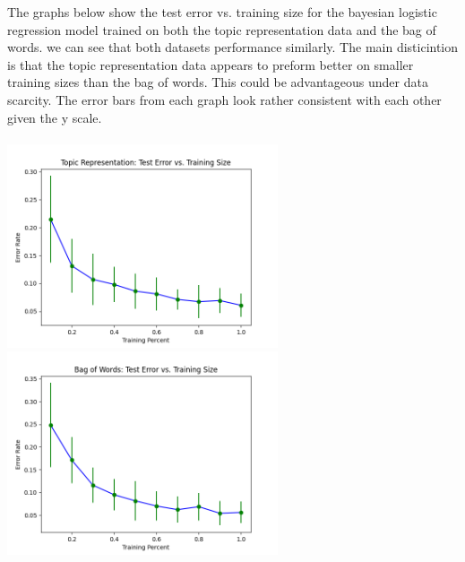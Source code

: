 \documentclass{article}
\begin{document}
The graphs below show the test error vs. training size for the bayesian logistic regression model trained on both the topic representation data and the bag of words. we can see that both datasets performance similarly. The main disticintion is that the topic representation data appears to preform better on smaller training sizes than the bag of words. This could be advantageous under data scarcity. The error bars from each graph look rather consistent with each other given the y scale.
\\ \\
\includegraphics[width=0.6\textwidth]{../output/t2-topic.png}
\includegraphics[width=0.6\textwidth]{../output/t2-bag.png}
\\ \\
\end{document}
